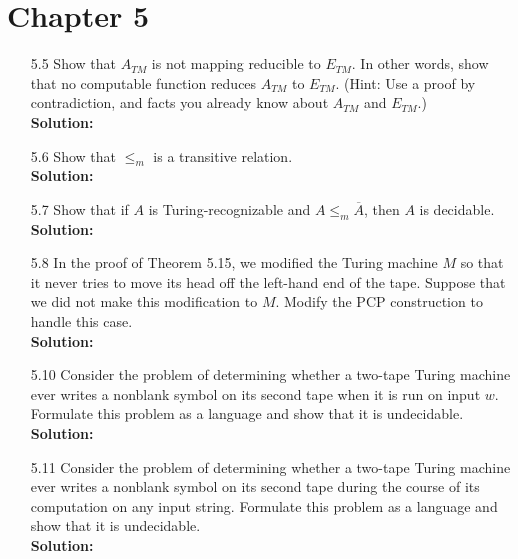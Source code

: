 \section{Chapter 5}
\begin{enumerate}

\item[5.5]Show that $A_{TM}$ is not mapping reducible to $E_{TM}$. In other words, show that no computable function reduces $A_{TM}$ to $E_{TM}$. (Hint: Use a proof by contradiction, and facts you already know about $A_{TM}$ and $E_{TM}$.)
\\
\textbf{Solution:} \alreadyanswered

\item[5.6]Show that $\le_m$ is a transitive relation.
\\
\textbf{Solution:} \alreadyanswered

\item[5.7]Show that if $A$ is Turing-recognizable and $A \le_m \overline{A}$, then $A$ is decidable.
\\
\textbf{Solution:} \alreadyanswered

\item[5.8]In the proof of Theorem 5.15, we modified the Turing machine $M$ so that it never tries to move its head off the left-hand end of the tape. Suppose that we did not make this modification to $M$. Modify the PCP construction to handle this case.
\\
\textbf{Solution:} \alreadyanswered

\item[5.10]Consider the problem of determining whether a two-tape Turing machine ever writes a nonblank symbol on its second tape when it is run on input $w$. Formulate this problem as a language and show that it is undecidable.
\\
\textbf{Solution:} \alreadyanswered

\item[5.11]Consider the problem of determining whether a two-tape Turing machine ever writes a nonblank symbol on its second tape during the course of its computation on any input string. Formulate this problem as a language and show that it is undecidable.
\\
\textbf{Solution:} \alreadyanswered


\end{enumerate}
